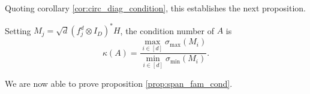 Quoting corollary \ref{cor:circ_diag_condition}, this establishes the next proposition.

\begin{proposition}
  Setting $M_j = \sqrt{d}\left(f_j^d \otimes I_D\right)^* H$, the condition number of $A$ is \[\kappa(A) = \dfrac{\max\limits_{i \in [d]} \sigma_{\max} (M_i)}{\min\limits_{i \in [d]} \sigma_{\min} (M_i)}.\] \label{prop:meas_cond}
\end{proposition}

We are now able to prove proposition \ref{prop:span_fam_cond}.

